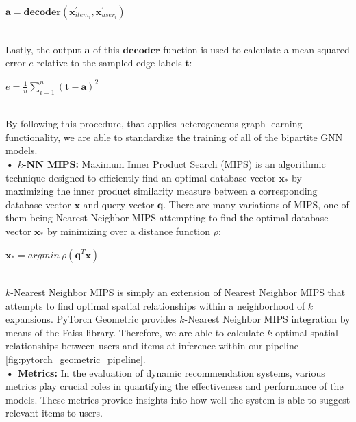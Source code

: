 \documentclass{scrartcl}
\begin{document}
\begin{center}
    $\mathbf{a} = \textbf{decoder}(\mathbf{x}^{\prime}_{item_{i}},\mathbf{x}^{\prime}_{user_{i}})$ \\~\\
\end{center} 

Lastly, the output $\mathbf{a}$ of this $\textbf{decoder}$ function is used to calculate a mean squared error $e$ relative to the sampled edge labels $\mathbf{t}$:

\begin{center}
    $e = \frac{1}{n} \sum_{i=1}^{n} (\mathbf{t} - \mathbf{a})^2$\\~\\
\end{center}

By following this procedure, that applies heterogeneous graph learning functionality, we are able to standardize the training of all of the bipartite GNN models. \\ 

\textbf{• $k$-NN MIPS:} Maximum Inner Product Search (MIPS) is an algorithmic technique designed to efficiently find an optimal database vector $\mathbf{x_{*}}$ by maximizing the inner product similarity measure between a corresponding database vector $\mathbf{x}$ and query vector $\mathbf{q}$. There are many variations of MIPS, one of them being Nearest Neighbor MIPS\cite{nnmips1, nnmips2} attempting to find the optimal database vector $\mathbf{x_{*}}$ by minimizing over a distance function $\rho$: \\ 

\begin{center}
    $\mathbf{x_{*}} = argmin \ \rho(\mathbf{q}^T \mathbf{x})$\\~\\
\end{center}

$k$-Nearest Neighbor MIPS\cite{nnmips3} is simply an extension of Nearest Neighbor MIPS that attempts to find optimal spatial relationships within a neighborhood of $k$ expansions.
PyTorch Geometric provides $k$-Nearest Neighbor MIPS\cite{nnmips3} integration by means of the Faiss library\cite{faiss}. Therefore, we are able to calculate $k$ optimal spatial relationships between users and items at inference within our pipeline \ref{fig:pytorch_geometric_pipeline}. \\ 

\textbf{• Metrics:} In the evaluation of dynamic recommendation systems, various metrics play crucial roles in quantifying the effectiveness and performance of the models. These metrics provide insights into how well the system is able to suggest relevant items to users. 
\end{document}
